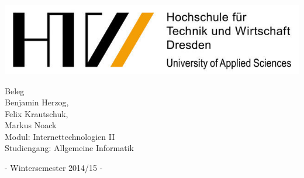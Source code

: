 \documentclass[a4paper,oneside,titlepage,12pt]{article}
\begin{document}
\begin{titlepage}
\begin{center}
	\includegraphics[width=.5\textwidth]{Bilder/HTW-Logo.png}
\end{center}
	\begin{center}
        	
        	\vspace*{2cm}
		\Huge{Beleg\\} \vspace*{1cm}
		\huge{Benjamin Herzog,\\ Felix Krautschuk,\\ Markus Noack\\}
		\vspace*{1cm}
		\Large{
			Modul: Internettechnologien II\\}
		\vspace*{2cm}
		\normalsize{
			Studiengang: Allgemeine Informatik\\
		}
	\end{center}
	\vspace{4cm}
\begin{center}
    \large{ - Wintersemester 2014/15 -  \\}
    \vspace*{2cm}
\end{center}
\end{titlepage}




\setcounter{page}{2} 
\tableofcontents
{} \setcounter{roemisch}{\value{page}}

\setcounter{page}{2}

\clearpage
\end{document}
